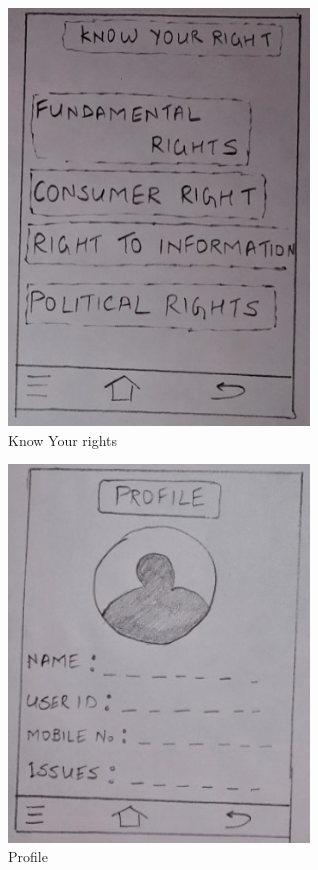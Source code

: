 \documentclass[acmtog]{acmart}
\begin{document}
\begin{figure}[H]
    \includegraphics[width=8cm]{Resources/KnowRight.jpg}
    \caption{Know Your rights}
    \label{fig:knowRights}
\end{figure}
\begin{figure}[H]
    \includegraphics[width=8cm]{Resources/Profile.jpg}
    \caption{Profile}
    \label{fig:profile}
\end{figure}
\end{document}
